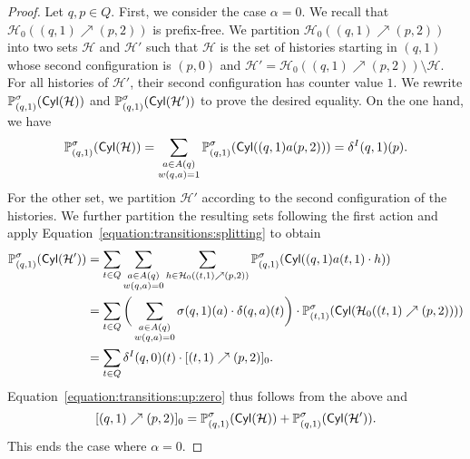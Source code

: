 \documentclass[a4paper,UKenglish,cleveref,autoref,thm-restate,colorlinks]{lipics-v2021}
\newcommand{\cyl}[1]{\mathsf{Cyl}(#1)}
\newcommand{\histPart}{\mathcal{H}}
\newcommand{\hist}{h}
\newcommand{\histConcat}[2]{#1\cdot{}#2}
\newcommand{\weight}{w}
\newcommand{\ocStateSpace}{Q}
\newcommand{\ocState}{q}
\newcommand{\ocStateB}{p}
\newcommand{\ocStateC}{t}
\newcommand{\ocActionSpace}{A}
\newcommand{\ocAction}{a}
\newcommand{\ocTrans}{\delta}
\newcommand{\interval}{I}
\newcommand{\powerIndex}{\alpha}
\newcommand{\upProba}[5]{[(#1,#2)\nearrow{}(#3,#4)]_{#5}}
\newcommand{\upHistSet}[5]{\histPart_{#5}((#1,#2)\nearrow{}(#3,#4))}
\newcommand{\stratGeneric}[1]{{\sigma_{#1}}}
\newcommand{\strat}{\stratGeneric{}}
\begin{document}
\begin{proof}
  Let $\ocState, \ocStateB\in\ocStateSpace$.
  First, we consider the case $\powerIndex = 0$.
  We recall that $\upHistSet{\ocState}{1}{\ocStateB}{2}{0}$ is prefix-free.
  We partition $\upHistSet{\ocState}{1}{\ocStateB}{2}{0}$ into two sets $\histPart$ and $\histPart'$ such that $\histPart$ is the set of histories starting in $(\ocState, 1)$ whose second configuration is $(\ocStateB, 0)$ and $\histPart'= \upHistSet{\ocState}{1}{\ocStateB}{2}{0}\setminus\histPart$.
  For all histories of $\histPart'$, their second configuration has counter value $1$.
  We rewrite $\probaG{(\ocState, 1)}{\strat}(\cyl{\histPart})$ and $\probaG{(\ocState, 1)}{\strat}(\cyl{\histPart'})$ to prove the desired equality.
  On the one hand, we have
  \[\probaG{(\ocState, 1)}{\strat}(\cyl{\histPart}) =
    \sum_{\substack{\ocAction\in\ocActionSpace(\ocState) \\ \weight(\ocState,\ocAction)=1}}
    \probaG{(\ocState, 1)}{\strat}(\cyl{(\ocState, 1)\ocAction(\ocStateB, 2)}) =
    \ocTrans^\interval(\ocState, 1)(\ocStateB).
  \]
  For the other set, we partition $\histPart'$ according to the second configuration of the histories.
  We further partition the resulting sets following the first action and apply Equation~\eqref{equation:transitions:splitting} to obtain
  \begin{align*}
    \probaG{(\ocState, 1)}{\strat}(\cyl{\histPart'})
    & =
      \sum_{\ocStateC\in\ocStateSpace}
      \sum_{\substack{\ocAction\in\ocActionSpace(\ocState) \\ \weight(\ocState,\ocAction)=0}}
    \sum_{\hist\in\upHistSet{\ocStateC}{1}{\ocStateB}{2}{0}}
    \probaG{(\ocState, 1)}{\strat}(\cyl{\histConcat{(\ocState, 1)\ocAction(\ocStateC, 1)}{\hist}}) \\
    & =
      \sum_{\ocStateC\in\ocStateSpace}
      \bigg(
      \sum_{\substack{\ocAction\in\ocActionSpace(\ocState) \\ \weight(\ocState,\ocAction)=0}}
    \strat(\ocState, 1)(\ocAction)\cdot\delta(\ocState, \ocAction)(\ocStateC)\bigg)\cdot    
    \probaG{(\ocStateC, 1)}{\strat}(\cyl{\upHistSet{\ocStateC}{1}{\ocStateB}{2}{0}}) \\
    & = \sum_{\ocStateC\in\ocStateSpace}
      \ocTrans^\interval(\ocState, 0)(\ocStateC)\cdot\upProba{\ocStateC}{1}{\ocStateB}{2}{0}.
  \end{align*}
  Equation~\eqref{equation:transitions:up:zero} thus follows from the above and
  \[\upProba{\ocState}{1}{\ocStateB}{2}{0} =
    \probaG{(\ocState, 1)}{\strat}(\cyl{\histPart}) +
    \probaG{(\ocState, 1)}{\strat}(\cyl{\histPart'}) .
  \]
  This ends the case where $\powerIndex= 0$.


\end{proof}
\end{document}
